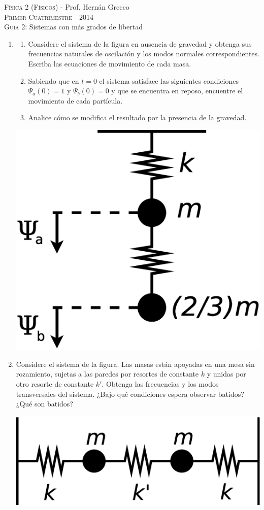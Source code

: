 \documentclass[11pt,spanish,a4paper]{article}
\begin{document}
\begin{center}
	\textsc{\large Física 2 (Físicos)} - Prof. Hernán Grecco\\
	\textsc{\large Primer Cuatrimestre - 2014}\\
	\textsc{\large Guía 2:} Sistemas con más grados de libertad
\end{center}

\begin{enumerate}
\item
\begin{enumerate}
	\item Considere el sistema de la figura en ausencia de gravedad y obtenga sus frecuencias naturales de oscilación y los modos normales
	correspondientes.
	Escriba las ecuaciones de movimiento de cada masa.
	\item Sabiendo que en \(t=0\) el sistema satisface las siguientes condiciones \(\Psi_a(0)=1\) y \(\Psi_b(0)=0\) y que se encuentra en reposo, encuentre el movimiento de cada partícula.
	\item Analice cómo se modifica el resultado por la presencia de la gravedad.
	\end{enumerate}
 	\begin{center}
		\includegraphics[width=0.2\linewidth]{ej1-6}
 	\end{center}

\item
	Considere el sistema de la figura.
	Las masas están apoyadas en una mesa sin rozamiento, sujetas a las paredes por resortes de constante \(k\) y unidas por otro resorte de constante \(k'\).
	Obtenga las frecuencias y los modos transversales del sistema.
	¿Bajo qué condiciones espera observar batidos?
	¿Qué son batidos?

    \begin{center}
		\includegraphics[width=0.2\linewidth]{ej1-8}
    \end{center}


\end{enumerate}
\end{document}
